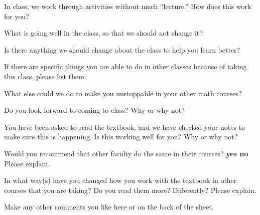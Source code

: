 \anonymous


\blist{0.5in}
\item In class, we work through activities without much ``lecture.''
How does this work for you?

\item What is going well in the class, so that we should not change it?

\item Is there anything we should change about the class to help you learn better?

\item If there are specific things you are able to do in other classes because of taking this class, please list them.

\item What else could we do to make you unstoppable in your other math courses?

\item Do you look forward to coming to class?  Why or why not?

\item You have been asked to read the textbook, and we have checked your notes to make sure this is happening.
Is this working well for you?
Why or why not?

\vspace{0.5in}
Would you recommend that other faculty do the same in their courses?
{\bf yes \quad no}
\\
Please explain.
\vspace*{0.5in}

\item In what way(s) have you changed how you work with the textbook in other courses that you are taking?  Do you read them more?  Differently?
Please explain.

\item Make any other comments you like here or on the back of the sheet.

\elist
\vfill          %
